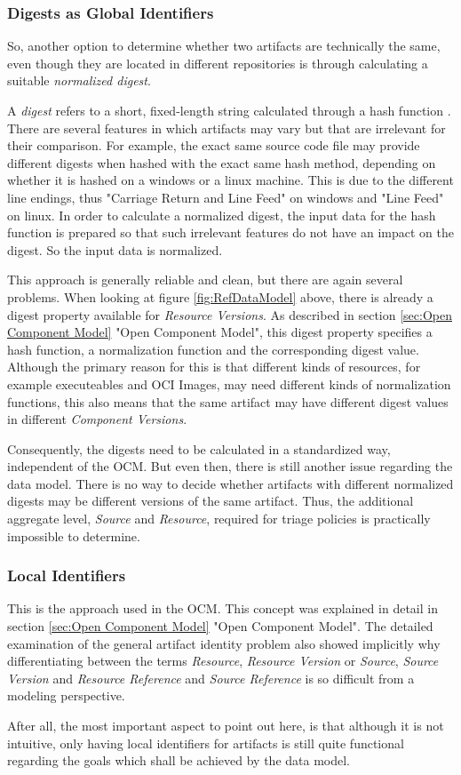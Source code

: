 \subsubsection{Digests as Global Identifiers} 
So, another option to determine whether two artifacts are technically the same, even though they are located in different repositories is through calculating a suitable \emph{normalized digest}.\par 
A \emph{digest} refers to a short, fixed-length string calculated through a hash function \cite{Cryptography}. There are several features in which artifacts may vary but that are irrelevant for their comparison. For example, the exact same source code file may provide different digests when hashed with the exact same hash method, depending on whether it is hashed on a windows or a linux machine. This is due to the different line endings, thus "Carriage Return and Line Feed" on windows and "Line Feed" on linux. In order to calculate a normalized digest, the input data for the hash function is prepared so that such irrelevant features do not have an impact on the digest. So the input data is normalized.\par
This approach is generally reliable and clean, but there are again several problems. When looking at figure \ref{fig:RefDataModel} above, there is already a digest property available for \emph{Resource Versions}. As described in section \ref{sec:Open Component Model} "Open Component Model", this digest property specifies a hash function, a normalization function and the corresponding digest value. Although the primary reason for this is that different kinds of resources, for example executeables and OCI Images, may need different kinds of normalization functions, this also means that the same artifact may have different digest values in different \emph{Component Versions}.\par
Consequently, the digests need to be calculated in a standardized way, independent of the OCM. But even then, there is still another issue regarding the data model. There is no way to decide whether artifacts with different normalized digests may be different versions of the same artifact. Thus, the additional aggregate level, \emph{Source} and \emph{Resource}, required for triage policies is practically impossible to determine.

\subsubsection{Local Identifiers}
This is the approach used in the OCM. This concept was explained in detail in section \ref{sec:Open Component Model} "Open Component Model". The detailed examination of the general artifact identity problem also showed implicitly why differentiating between the terms \emph{Resource}, \emph{Resource Version} or \emph{Source}, \emph{Source Version} and \emph{Resource Reference} and \emph{Source Reference} is so difficult from a modeling perspective.\par
After all, the most important aspect to point out here, is that although it is not intuitive, only having local identifiers for artifacts is still quite functional regarding the goals which shall be achieved by the data model.

